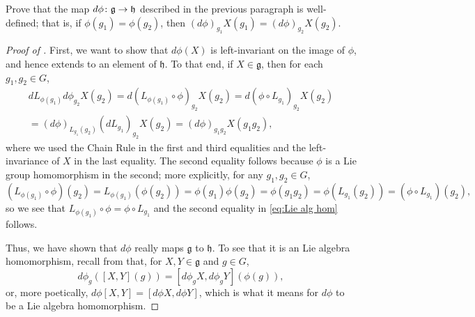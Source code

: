 \begin{exercise}
	Prove that the map $d\phi \colon\thinspace\! \mathfrak{g} \to \mathfrak{h}$ described in the previous paragraph is well-defined; that is, if $\phi(g_1) = \phi(g_2)$, then $(d\phi)_{g_1}X(g_1) = (d\phi)_{g_2}X(g_2)$.
\end{exercise}

\begin{proof}[Proof of ]
	First, we want to show that $d\phi(X)$ is left-invariant on the image of $\phi$, and hence extends to an element of $\mathfrak{h}$. To that end, if $X \in \mathfrak{g}$, then for each $g_1,g_2 \in G$,
	\begin{multline}\label{eq:Lie alg hom}
		dL_{\phi(g_1)} d\phi_{g_2}X(g_2) = d\left(L_{\phi(g_1)} \circ \phi\right)_{g_2} X(g_2) = d\left(\phi \circ L_{g_1}\right)_{g_2}X(g_2) \\
		= \left(d\phi\right)_{L_{g_1}(g_2)}\left(dL_{g_1}\right)_{g_2}X(g_2) = \left(d\phi\right)_{g_1 g_2}X(g_1 g_2),
	\end{multline}
	where we used the Chain Rule in the first and third equalities and the left-invariance of $X$ in the last equality. The second equality follows because $\phi$ is a Lie group homomorphism in the second; more explicitly, for any $g_1,g_2 \in G$,
	\[
		\left(L_{\phi(g_1)} \circ \phi\right)(g_2) = L_{\phi(g_1)}\left( \phi(g_2)\right) = \phi(g_1) \phi(g_2) = \phi(g_1 g_2) = \phi(L_{g_1}(g_2)) = \left(\phi \circ L_{g_1}\right)(g_2),
	\]
	so we see that $L_{\phi(g_1)} \circ \phi = \phi \circ L_{g_1}$ and the second equality in \eqref{eq:Lie alg hom} follows.
	
	Thus, we have shown that $d\phi$ really maps $\mathfrak{g}$ to $\mathfrak{h}$. To see that it is an Lie algebra homomorphism, recall from  that, for $X,Y \in \mathfrak{g}$ and $g \in G$,
	\[
		d\phi_g\left([X,Y](g)\right) = [d\phi_gX, d\phi_gY](\phi(g)),
	\]
	or, more poetically, $d\phi[X,Y] = [d\phi X, d\phi Y]$, which is what it means for $d\phi$ to be a Lie algebra homomorphism.
\end{proof}

